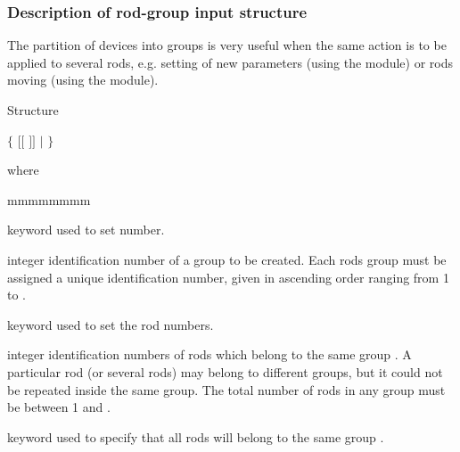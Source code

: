 \subsubsection{Description of rod-group input structure}\label{sect:rodgroupstr}

The partition of devices into groups is very useful when the same action is
to be applied to several rods, e.g. setting of new parameters (using the
 module) or rods moving (using the  module).

\begin{DataStructure}{Structure }

  $\{$ 
$[[$  $]]$  $|$   $\}$ \\

\end{DataStructure}

\noindent where
\begin{ListeDeDescription}{mmmmmmmm}

\item[\moc{GROUP-ID}] keyword used to set  number.

\item[\dusa{igrp}] integer identification number of a group to be created.
Each rods group must be assigned a unique identification number, given
in ascending order ranging from 1 to .

\item[\moc{ROD-ID}] keyword used to set the rod  numbers.

\item[\dusa{id}] integer identification numbers of rods which belong
to the same group . A particular rod (or several rods) may
belong to different groups, but it could not be repeated inside the same
group. The total number of rods in any group must be between
1 and .

\item[\moc{ALL}] keyword used to specify that all rods
will belong to the same group .

\end{ListeDeDescription}
\clearpage
